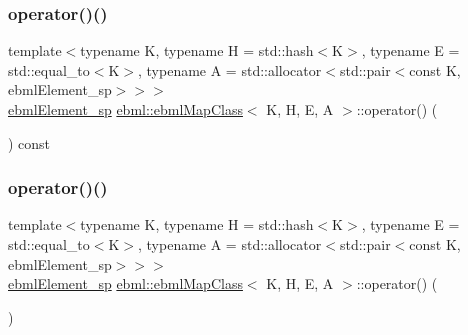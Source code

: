 \mbox{\label{classebml_1_1ebmlMapClass_a65bc7cbdb0b605e7476222e28ebfcf46}} 
\subsubsection{\texorpdfstring{operator()()}{operator()()}\hspace{0.1cm}{\footnotesize\ttfamily [2/12]}}
{\footnotesize\ttfamily template$<$typename K, typename H = std\+::hash$<$\+K$>$, typename E = std\+::equal\+\_\+to$<$\+K$>$, typename A = std\+::allocator$<$std\+::pair$<$const K, ebml\+Element\+\_\+sp$>$$>$$>$ \\
\mbox{\hyperlink{namespaceebml_adad533b7705a16bb360fe56380c5e7be}{ebml\+Element\+\_\+sp}} \mbox{\hyperlink{classebml_1_1ebmlMapClass}{ebml\+::ebml\+Map\+Class}}$<$ K, H, E, A $>$\+::operator() (\begin{DoxyParamCaption}\item[{std\+::initializer\+\_\+list$<$ \mbox{\hyperlink{namespaceebml_adad533b7705a16bb360fe56380c5e7be}{ebml\+Element\+\_\+sp}} $>$}]{ }\end{DoxyParamCaption}) const}

\mbox{\label{classebml_1_1ebmlMapClass_a8163549b01fe31fcb130f5bc8d4250d7}} 
\subsubsection{\texorpdfstring{operator()()}{operator()()}\hspace{0.1cm}{\footnotesize\ttfamily [3/12]}}
{\footnotesize\ttfamily template$<$typename K, typename H = std\+::hash$<$\+K$>$, typename E = std\+::equal\+\_\+to$<$\+K$>$, typename A = std\+::allocator$<$std\+::pair$<$const K, ebml\+Element\+\_\+sp$>$$>$$>$ \\
\mbox{\hyperlink{namespaceebml_adad533b7705a16bb360fe56380c5e7be}{ebml\+Element\+\_\+sp}} \mbox{\hyperlink{classebml_1_1ebmlMapClass}{ebml\+::ebml\+Map\+Class}}$<$ K, H, E, A $>$\+::operator() (\begin{DoxyParamCaption}{ }\end{DoxyParamCaption})}

